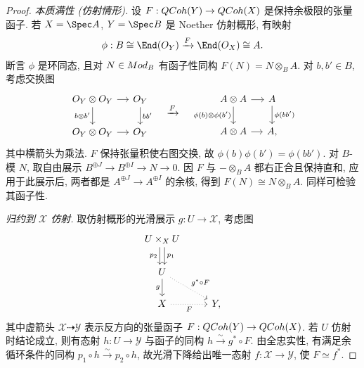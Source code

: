 \begin{proof}
\emph{本质满性 (仿射情形).} 设 $F:QCoh(Y)\to QCoh(X)$ 是保持余极限的张量函子. 若 $\mathcal X=\Spec A$, $\mathcal Y=\Spec B$ 是 Noether 仿射概形, 有映射
\begin{align*}
\phi:B\cong\End(\mathcal O_{\mathcal Y})\xrightarrow F\End(\mathcal O_{\mathcal X})\cong A.
\end{align*}
断言 $\phi$ 是环同态, 且对 $N\in Mod_B$ 有函子性同构 $F(N)=N\otimes_BA$. 对 $b,b'\in B$, 考虑交换图
\begin{align*}
\begin{tikzcd}[ampersand replacement=\&,column sep=small]
\mathcal O_{\mathcal Y}\otimes\mathcal O_{\mathcal Y}\arrow[r]\arrow[d,"{b\otimes b'}"']\&\mathcal O_{\mathcal Y}\arrow[d,"{bb'}"]\\
\mathcal O_{\mathcal Y}\otimes\mathcal O_{\mathcal Y}\arrow[r]\&\mathcal O_{\mathcal Y}
\end{tikzcd}
\quad\xrightarrow{F}\quad
\begin{tikzcd}[ampersand replacement=\&,column sep=small]
A\otimes A\arrow[r]\arrow[d,"{\phi(b)\otimes\phi(b')}"']\&A\arrow[d,"{\phi(bb')}"]\\
A\otimes A\arrow[r]\&A,
\end{tikzcd}
\end{align*}
其中横箭头为乘法. $F$ 保持张量积使右图交换, 故 $\phi(b)\phi(b')=\phi(bb')$. 对 $B$-模 $N$, 取自由展示 $B^{\oplus J}\to B^{\oplus I}\to N\to0$. 因 $F$ 与 $-\otimes_BA$ 都右正合且保持直和, 应用于此展示后, 两者都是 $A^{\oplus J}\to A^{\oplus I}$ 的余核, 得到 $F(N)\cong N\otimes_BA$. 同样可检验其函子性.

\emph{归约到 $\mathcal X$ 仿射.} 取仿射概形的光滑展示 $g:U\to\mathcal X$, 考虑图
\begin{align*}
\begin{tikzcd}[ampersand replacement=\&]
U\times_{\mathcal X}U\arrow[d,shift left,"{p_1}"]\arrow[d,shift right,"{p_2}"']\&\\
U\arrow[d,"{g}"']\arrow[dr,dotted,"{g^*\circ F}"]\&\\
\mathcal X\arrow[r,dotted,"{F}"']\&\mathcal Y,
\end{tikzcd}
\end{align*}
其中虚箭头 $\mathcal X\dashrightarrow\mathcal Y$ 表示反方向的张量函子 $F:QCoh(Y)\to QCoh(X)$. 若 $U$ 仿射时结论成立, 则有态射 $h:U\to\mathcal Y$ 与函子的同构 $h\xrightarrow{\sim}g^*\circ F$. 由全忠实性, 有满足余循环条件的同构 $p_1\circ h\xrightarrow{\sim}p_2\circ h$, 故光滑下降给出唯一态射 $f:\mathcal X\to\mathcal Y$, 使 $F\simeq f^*$.


\end{proof}
